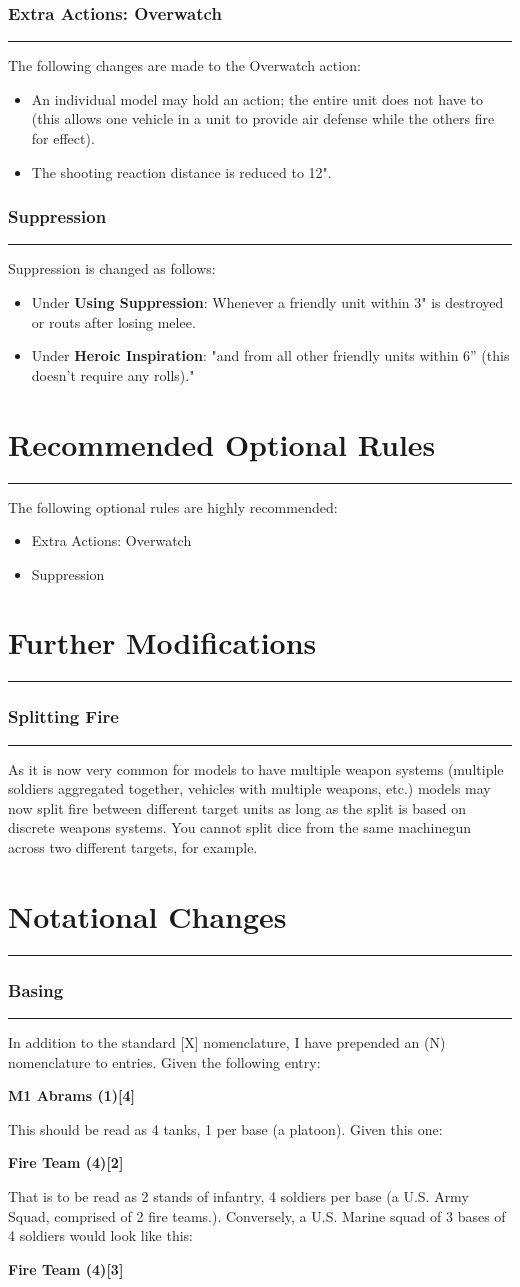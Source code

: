 \documentclass[11pt]{article}
\newcommand{\mysection}[1]{
  \section*{\centering #1}
  \raggedright
  \hrule
  \bigskip

}
\newcommand{\myheading}[1]{
  \subsubsection*{\centering #1}
  \raggedright
  \hrule
}
\begin{document}
\begin{multicols*}{3}[]
\myheading{Extra Actions: Overwatch}

The following changes are made to the Overwatch action:

\begin{itemize}

\item An individual model may hold an action; the entire unit does not have to
(this allows one vehicle in a unit to provide air defense while the others fire
for effect).
\item The shooting reaction distance is reduced to 12".

\end{itemize}

\myheading{Suppression}

Suppression is changed as follows:

\begin{itemize}
  \item Under {\bf Using Suppression}: Whenever a friendly unit within 3" is
  destroyed or routs after losing melee.
  \item Under {\bf Heroic Inspiration}: "and from all other friendly
  units within 6” (this doesn’t require any rolls)."
\end{itemize}

\mysection{Recommended Optional Rules}

The following optional rules are highly recommended:

\begin{itemize}
  \item Extra Actions: Overwatch
  \item Suppression
\end{itemize}

\mysection{Further Modifications}

\myheading{Splitting Fire}

As it is now very common for models to have multiple weapon systems (multiple
soldiers aggregated together, vehicles with multiple weapons, etc.) models may
now split fire between different target units as long as the split is based on
discrete weapons systems. You cannot split dice from the same machinegun across
two different targets, for example.

\mysection{Notational Changes}

\myheading{Basing}

In addition to the standard [X] nomenclature, I have prepended an (N)
nomenclature to entries. Given the following entry:

{\bf M1 Abrams (1)[4]}

This should be read as 4 tanks, 1 per base (a platoon). Given this one:

{\bf Fire Team (4)[2]}

That is to be read as 2 stands of infantry, 4 soldiers per base (a U.S. Army
Squad, comprised of 2 fire teams.). Conversely, a U.S. Marine squad of 3 bases
of 4 soldiers would look like this:

{\bf Fire Team (4)[3]}

\end{multicols*}
\end{document}
